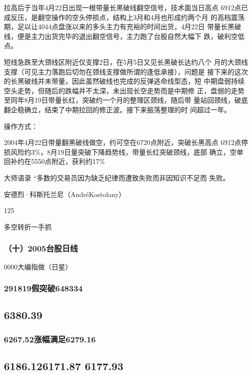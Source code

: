 \documentclass{article}
\begin{document}
拉高后于当年4月22日出现一根带量长黑破线翻空信号，技术面当日高点 6912点已成反压，是翻空操作的空头停损点，结构上3月和4月也形成约两个月 的高档震荡期，足以让4044点盘涨以来的多头主力有充裕的时间出货，4月22日 带量长黑破线，便是主力出货完毕的退出翻空信号，主力跑了台股自然大幅下 跌，破利空低点。

短线急跌至大颈线区附近仅支撑2日，在5月5日又见长黑破长达约八个 月的大颈线支撑（可见主力落跑后切勿在颈线支撑做所谓的逢低承接），问题是 接下来的这次的长黑破线并未带量，因此虽然破线也完成的反弹逃命线型态，短 中期盘弱持续空头走势，但随后的跌幅并不太深，未出现长空走势而是中期修 正，盘弱的走势至同年8月19日带量长红，突破约一个月的整理区颈线，随后带 量站回颈线，破底翻企稳确立，结束了中期拉回的修正波。接下来振荡整理的时 间超过一年。

操作方式：

2004年4月22日带量翻黑破线做空，约可空在6720点附近，突破长黑高点 6912点停损风险约3\%，8月19日量突破下降趋势线，带量长红突破颈线，底部 确立，空单回补约在5550点附近，获利约17\%

大师语录 “多数的交易员因为缺乏纪律而遭致失败而非因知识不足而 失败。

安德烈·科斯托兰尼（AndréKostolany）

125

\clearpage

多空转折一手抓

\subsubsection{（十）2005台股日线}

0000大编指做（日星）

\subsubsection{291819假突破648334}

\subsection{6380.39}

\subsubsection{6267.52涨幅满足6279.16}

\subsection{6186.126171.87 6177.93}
\end{document}
